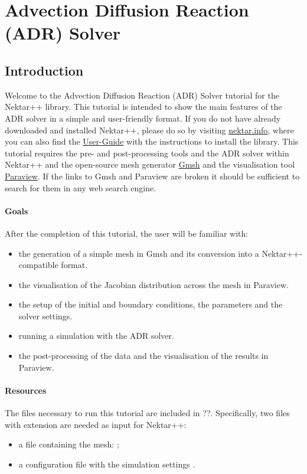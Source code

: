 \chapter{Advection Diffusion Reaction (ADR) Solver}
\label{ADR}

\section*{\Large Introduction}
Welcome to the Advection Diffusion Reaction (ADR) Solver tutorial for the Nektar++ library.
This tutorial is intended to show the main features of the ADR solver in a simple and user-friendly 
format. If you do not have already downloaded and installed Nektar++, please do so by visiting 
\href{http://www.nektar.info}{nektar.info}, where you can also find the 
\href{http://www.nektar.info/downloads/8}{User-Guide} with the instructions 
to install the library. This tutorial requires the pre- and post-processing tools and the ADR 
solver within Nektar++ and the open-source mesh generator \href{http://geuz.org/gmsh/}{Gmsh} 
and the visualisation tool \href{http://www.paraview.org}{Paraview}. If the links to Gmsh and Paraview 
are broken it should be sufficient to search for them in any web search engine.  


\subsubsection*{Goals}
After the completion of this tutorial, the user will be familiar with:
\vspace{-0.5cm}
\begin{itemize}
\item the generation of a simple mesh in Gmsh and its conversion into a Nektar++-compatible format.
\item the visualisation of the Jacobian distribution across the mesh in Paraview.
\item the setup of the initial and boundary conditions, the parameters and the solver settings.
\item running a simulation with the ADR solver.
\item the post-processing of the data and the visualisation of the results in Paraview.
\end{itemize}

\subsubsection*{Resources}
The files necessary to run this tutorial are included in ??.  
Specifically, two files with extension  are needed as input for Nektar++: 
\vspace{-0.5cm}
\begin{itemize}
\item a file containing the mesh: ;
\item a configuration file with the simulation settings .
\end{itemize}

